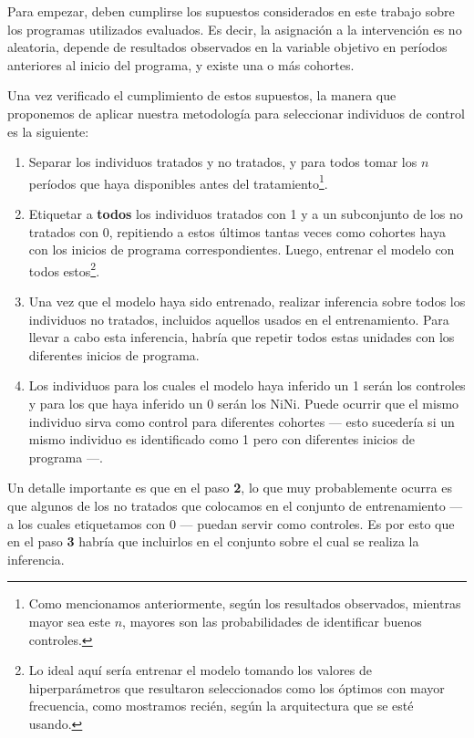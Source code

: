 \documentclass[../main.tex]{subfiles}
\begin{document}
Para empezar, deben cumplirse los supuestos considerados en este trabajo sobre los
programas utilizados evaluados. Es decir, la asignación a la intervención es no aleatoria,
depende de resultados observados en la variable objetivo en períodos anteriores al inicio
del programa, y existe una o más cohortes.

Una vez verificado el cumplimiento de estos supuestos, la manera que proponemos de aplicar
nuestra metodología para seleccionar individuos de control es la siguiente:
\begin{enumerate}[itemsep=0.1cm, label=\textbf{\arabic*.}]
    \item Separar los individuos tratados y no tratados, y para todos tomar los \(n\)
    períodos que haya disponibles antes del tratamiento\footnote{Como mencionamos
    anteriormente, según los resultados observados, mientras mayor sea este \(n\), mayores
    son las probabilidades de identificar buenos controles.}.
    \item Etiquetar a \textbf{todos} los individuos tratados con 1 y a un subconjunto de
    los no tratados con 0, repitiendo a estos últimos tantas veces como cohortes haya con
    los inicios de programa correspondientes. Luego, entrenar el modelo con todos
    estos\footnote{Lo ideal aquí sería entrenar el modelo tomando los valores de
    hiperparámetros que resultaron seleccionados como los óptimos con mayor frecuencia,
    como mostramos recién, según la arquitectura que se esté usando.}.
    \item Una vez que el modelo haya sido entrenado, realizar inferencia sobre todos los
    individuos no tratados, incluidos aquellos usados en el entrenamiento. Para llevar a
    cabo esta inferencia, habría que repetir todos estas unidades con los diferentes
    inicios de programa.
    \item Los individuos para los cuales el modelo haya inferido un 1 serán los controles
    y para los que haya inferido un 0 serán los NiNi. Puede ocurrir que el mismo individuo
    sirva como control para diferentes cohortes — esto sucedería si un mismo individuo es
    identificado como 1 pero con diferentes inicios de programa —.
\end{enumerate}

Un detalle importante es que en el paso \textbf{2}, lo que muy probablemente ocurra es que
algunos de los no tratados que colocamos en el conjunto de entrenamiento — a los cuales
etiquetamos con 0 — puedan servir como controles. Es por esto que en el paso \textbf{3}
habría que incluirlos en el conjunto sobre el cual se realiza la inferencia.
\end{document}

